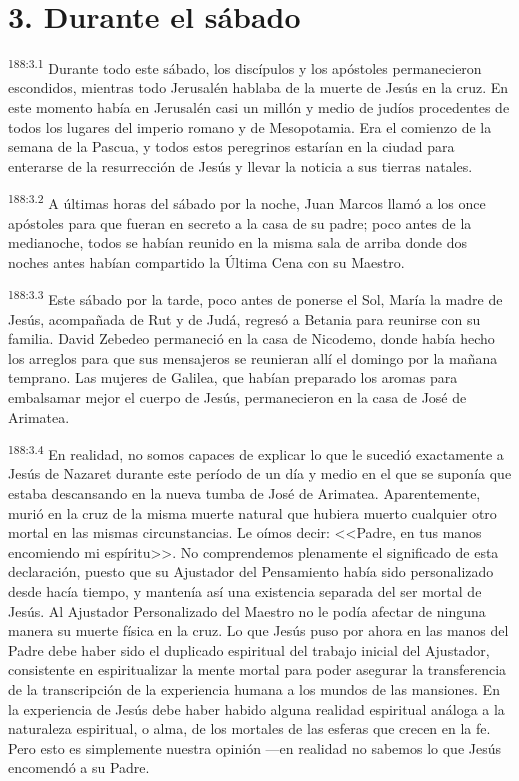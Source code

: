 \section*{3. Durante el sábado}
\par 
\textsuperscript{188:3.1} Durante todo este sábado, los discípulos y los apóstoles permanecieron escondidos, mientras todo Jerusalén hablaba de la muerte de Jesús en la cruz. En este momento había en Jerusalén casi un millón y medio de judíos procedentes de todos los lugares del imperio romano y de Mesopotamia. Era el comienzo de la semana de la Pascua, y todos estos peregrinos estarían en la ciudad para enterarse de la resurrección de Jesús y llevar la noticia a sus tierras natales.

\par 
\textsuperscript{188:3.2} A últimas horas del sábado por la noche, Juan Marcos llamó a los once apóstoles para que fueran en secreto a la casa de su padre; poco antes de la medianoche, todos se habían reunido en la misma sala de arriba donde dos noches antes habían compartido la Última Cena con su Maestro.

\par 
\textsuperscript{188:3.3} Este sábado por la tarde, poco antes de ponerse el Sol, María la madre de Jesús, acompañada de Rut y de Judá, regresó a Betania para reunirse con su familia. David Zebedeo permaneció en la casa de Nicodemo, donde había hecho los arreglos para que sus mensajeros se reunieran allí el domingo por la mañana temprano. Las mujeres de Galilea, que habían preparado los aromas para embalsamar mejor el cuerpo de Jesús, permanecieron en la casa de José de Arimatea.

\par 
\textsuperscript{188:3.4} En realidad, no somos capaces de explicar lo que le sucedió exactamente a Jesús de Nazaret durante este período de un día y medio en el que se suponía que estaba descansando en la nueva tumba de José de Arimatea. Aparentemente, murió en la cruz de la misma muerte natural que hubiera muerto cualquier otro mortal en las mismas circunstancias. Le oímos decir: <<Padre, en tus manos encomiendo mi espíritu>>. No comprendemos plenamente el significado de esta declaración, puesto que su Ajustador del Pensamiento había sido personalizado desde hacía tiempo, y mantenía así una existencia separada del ser mortal de Jesús. Al Ajustador Personalizado del Maestro no le podía afectar de ninguna manera su muerte física en la cruz. Lo que Jesús puso por ahora en las manos del Padre debe haber sido el duplicado espiritual del trabajo inicial del Ajustador, consistente en espiritualizar la mente mortal para poder asegurar la transferencia de la transcripción de la experiencia humana a los mundos de las mansiones. En la experiencia de Jesús debe haber habido alguna realidad espiritual análoga a la naturaleza espiritual, o alma, de los mortales de las esferas que crecen en la fe. Pero esto es simplemente nuestra opinión ---en realidad no sabemos lo que Jesús encomendó a su Padre.

